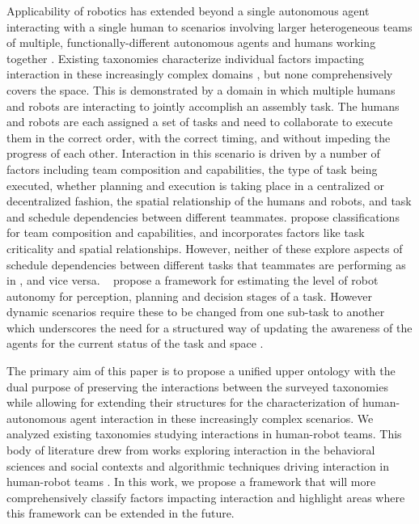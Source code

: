 \documentclass[letterpaper, 10 pt, conference]{ieeeconf}  %
\theoremstyle{definition}
\newcommand{\citet}[1]{\citeauthor{#1}~\cite{#1}}
\begin{document}
Applicability of robotics has extended beyond a single autonomous agent interacting with a single human to scenarios involving larger heterogeneous teams of multiple, functionally-different autonomous agents and humans working together \cite{Burke2004}.
Existing taxonomies characterize individual factors impacting interaction in these increasingly complex domains \cite{Beer2017,cao1997cooperative,Dudek2002updated,Goodrich2007,JiangArkin2015, Korsah2013, Yanco2004updated}, but none comprehensively covers the space. This is demonstrated by a domain in which multiple humans and robots are interacting to jointly accomplish an assembly task. The humans and robots are each assigned a set of tasks and need to collaborate to execute them in the correct order, with the correct timing, and without impeding the progress of each other. Interaction in this scenario is driven by a number of factors including team composition and capabilities, the type of task being executed, whether planning and execution is taking place in a centralized or decentralized fashion, the spatial relationship of the humans and robots, and task and schedule dependencies between different teammates.  
\cite{cao1997cooperative, Dudek2002updated} propose classifications for team composition and capabilities, and \cite{Yanco2004updated} incorporates factors like task criticality and spatial relationships. However, neither of these explore aspects of schedule dependencies between different tasks that teammates are performing as in \cite{Korsah2013}, and vice versa.
\citet{Beer2014toward} propose a framework for estimating the level of robot autonomy for perception, planning and decision stages of a task.
However dynamic scenarios require these to be changed from one sub-task to another which underscores the need for a structured  way of updating the awareness of the agents for the current status of the task and space \cite{chen2018situation, endsley1988design}.

The primary aim of this paper is to propose a unified upper ontology with the dual purpose of preserving the interactions between the surveyed taxonomies while allowing for extending their structures for the characterization of human-autonomous agent interaction in these increasingly complex scenarios. We analyzed existing taxonomies studying interactions in human-robot teams. This body of literature drew from works exploring interaction in the behavioral sciences \cite{chen2018situation, endsley1988design, Mathieu2000TheIO} and social contexts \cite{Fong2003, Goodrich2007} and algorithmic techniques driving interaction in human-robot teams \cite{Korsah2013, Beer2017}. In this work, we propose a framework that will more comprehensively classify factors impacting interaction and highlight areas where this framework can be extended in the future. 
\end{document}
